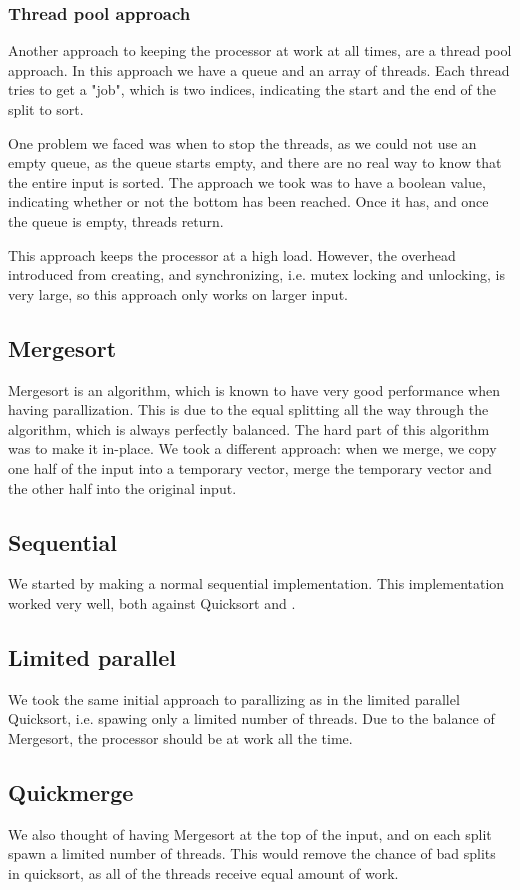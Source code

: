 \subsubsection{Thread pool approach}
Another approach to keeping the processor at work at all times, are a thread
pool approach. In this approach we have a queue and an array of threads. Each
thread tries to get a "job", which is two indices, indicating the start and the
end of the split to sort.

One problem we faced was when to stop the threads, as we could not use an empty
queue, as the queue starts empty, and there are no real way to know that the
entire input is sorted. The approach we took was to have a boolean value,
indicating whether or not the bottom has been reached. Once it has, and once
the queue is empty, threads return.

This approach keeps the processor at a high load. However, the overhead
introduced from creating, and synchronizing, i.e. mutex locking and unlocking,
is very large, so this approach only works on larger input.

\subsection{Mergesort}
Mergesort is an algorithm, which is known to have very good performance when
having parallization. This is due to the equal splitting all the way through
the algorithm, which is always perfectly balanced. The hard part of this
algorithm was to make it in-place. We took a different approach: when we merge,
we copy one half of the input into a temporary vector, merge the temporary
vector and the other half into the original input.

\subsection{Sequential}
We started by making a normal sequential implementation. This implementation
worked very well, both against Quicksort and .

\subsection{Limited parallel}
We took the same initial approach to parallizing as in the limited parallel
Quicksort, i.e. spawing only a limited number of threads. Due to the balance of
Mergesort, the processor should be at work all the time.

\subsection{Quickmerge}
We also thought of having Mergesort at the top of the input, and on each split
spawn a limited number of threads. This would remove the chance of bad splits
in quicksort, as all of the threads receive equal amount of work.

